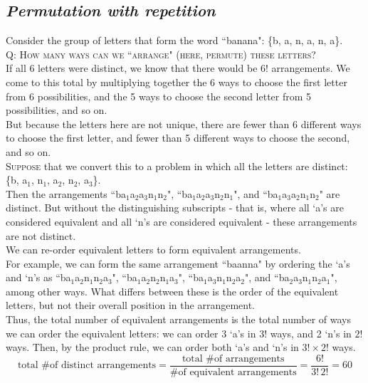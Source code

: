 \documentclass{article}
\begin{document}
\subsection{\em Permutation with repetition}
Consider the group of letters that form the word ``banana": \{b, a, n, a, n, a\}.\\[1ex]
\textsc{Q: How many ways can we ``arrange" (here, permute) these letters?}\\[1em]
If all 6 letters were distinct, we know that there would be $6!$ arrangements. We come to this total by multiplying together the 6 ways to choose the first letter from 6 possibilities, and the 5 ways to choose the second letter from 5 possibilities, and so on.\\[1ex]
But because the letters here are not unique, there are fewer than 6 different ways to choose the first letter, and fewer than 5 different ways to choose the second, and so on.\\[1em]
\textsc{Suppose} that we convert this to a problem in which all the letters are distinct: \{b, a$_1$, n$_1$, a$_2$, n$_2$, a$_3$\}.\\[1ex]
Then the arrangements ``ba$_1$a$_2$a$_3$n$_1$n$_2$", ``ba$_1$a$_2$a$_3$n$_2$n$_1$", and ``ba$_1$a$_3$a$_2$n$_1$n$_2$" are distinct. But without the distinguishing subscripts - that is, where all `a's are considered equivalent and all `n's are considered equivalent - these arrangements are not distinct.\\[1ex]
We can re-order equivalent letters to form equivalent arrangements.\\
For example, we can form the same arrangement ``baanna" by ordering the `a's and `n's as ``ba$_1$a$_2$n$_1$n$_2$a$_3$", ``ba$_1$a$_2$n$_2$n$_1$a$_3$", ``ba$_1$a$_3$n$_1$n$_2$a$_2$", and ``ba$_2$a$_3$n$_1$n$_2$a$_1$", among other ways. What differs between these is the order of the equivalent letters, but not their overall position in the arrangement.\\[1ex]
Thus, the total number of equivalent arrangements is the total number of ways we can order the equivalent letters: we can order 3 `a's in $3!$ ways, and 2 `n's in $2!$ ways. Then, by the product rule, we can order both `a's and `n's in $3!\times 2!$ ways.
\begin{equation*}
\text{total \# of distinct arrangements}=\dfrac{\text{total \# of arrangements}}{\text{\# of equivalent arrangements}}=\dfrac{6!}{3!\,2!}=60
\end{equation*}
\end{document}
